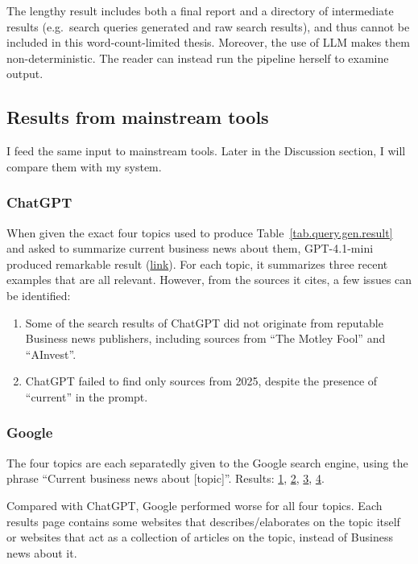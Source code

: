 \documentclass[final-report]{report-template}
\begin{document}
The lengthy result includes both a final report and a directory of intermediate
results (e.g.\ search queries generated and raw search results), and thus
cannot be included in this word-count-limited thesis. Moreover, the use of LLM
makes them non-deterministic. The reader can instead run the pipeline herself
to examine output.

\subsection{Results from mainstream tools}
I feed the same input to mainstream tools. Later in the Discussion section, I
will compare them with my system.

\subsubsection{ChatGPT}
When given the exact four topics used to produce
Table~\ref{tab.query.gen.result} and asked to summarize current business news
about them, GPT-4.1-mini produced remarkable result
(\href{https://chatgpt.com/share/689a428d-f01c-8011-a115-57b4ca19a278}{link}).
For each topic, it summarizes three recent examples that are all relevant.
However, from the sources it cites, a few issues can be identified:
\begin{enumerate}
	\item Some of the search results of ChatGPT did not originate from
		reputable Business news publishers, including sources from ``The Motley
		Fool'' and ``AInvest''.
	\item ChatGPT failed to find only sources from 2025, despite the presence of
		``current'' in the prompt.
\end{enumerate}

\subsubsection{Google}
The four topics are each separatedly given to the Google search engine, using
the phrase ``Current business news about [topic]''. Results: 
\href{https://www.google.com/search?q=Current+business+news+about+vertical+integration}{1}, 
\href{https://www.google.com/search?q=Current+business+news+about+diversification+strategies}{2}, 
\href{https://www.google.com/search?q=Current+business+news+about+competitive+advantage}{3}, 
\href{https://www.google.com/search?q=Current+business+news+about+foreign+direct+investment}{4}.

Compared with ChatGPT, Google performed worse for all four topics. Each
results page contains some websites that describes/elaborates on the topic
itself or websites that act as a collection of articles on the topic, instead
of Business news about it. 
\end{document}
